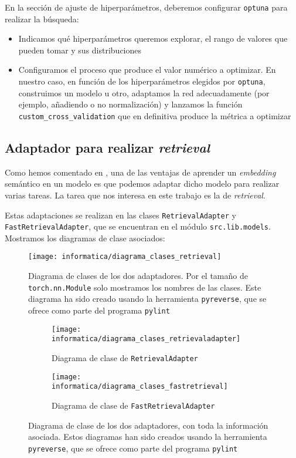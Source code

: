 En la sección de ajuste de hiperparámetros, deberemos configurar \lstinline{optuna} para realizar la búsqueda:

\begin{itemize}
    \item Indicamos qué hiperparámetros queremos explorar, el rango de valores que pueden tomar y sus distribuciones
    \item Configuramos el proceso que produce el valor numérico a optimizar. En nuestro caso, en función de los hiperparámetros elegidos por \lstinline{optuna}, construimos un modelo u otro, adaptamos la red adecuadamente (por ejemplo, añadiendo o no normalización) y lanzamos la función \lstinline{custom_cross_validation} que en definitiva produce la métrica a optimizar
\end{itemize}

\subsection{Adaptador para realizar \textit{retrieval}} \label{isubs:impl_retr_adapter}

Como hemos comentado en , una de las ventajas de aprender un \textit{embedding} semántico en un modelo es que podemos adaptar dicho modelo para realizar varias tareas. La tarea que nos interesa en este trabajo es la de \textit{retrieval}.

Estas adaptaciones se realizan en las clases \lstinline{RetrievalAdapter} y \lstinline{FastRetrievalAdapter}, que se encuentran en el módulo \lstinline{src.lib.models}. Mostramos los diagramas de clase asociados:

\begin{figure}[H]
    \centering
    \texttt{[image: informatica/diagrama\_clases\_retrieval]}
    \caption{Diagrama de clases de los dos adaptadores. Por el tamaño de \lstinline{torch.nn.Module} solo mostramos los nombres de las clases. Este diagrama ha sido creado usando la herramienta \lstinline{pyreverse}, que se ofrece como parte del programa \lstinline{pylint}}
    \label{img:diagrama_clases_global_adaptadores}
\end{figure}

\begin{figure}[H]
\centering
    \begin{subfigure}{.6\textwidth}
        \centering
        \texttt{[image: informatica/diagrama\_clases\_retrievaladapter]}
        \caption{Diagrama de clase de \lstinline{RetrievalAdapter}}
    \end{subfigure}%
    \begin{subfigure}{.4\textwidth}
        \centering
        \texttt{[image: informatica/diagrama\_clases\_fastretrieval]}
        \caption{Diagrama de clase de \lstinline{FastRetrievalAdapter}}
    \end{subfigure}
\caption{Diagrama de clase de los dos adaptadores, con toda la información asociada. Estos diagramas han sido creados usando la herramienta \lstinline{pyreverse}, que se ofrece como parte del programa \lstinline{pylint}}
\label{img:diagramas_clase_concretos_adaptadores}
\end{figure}

